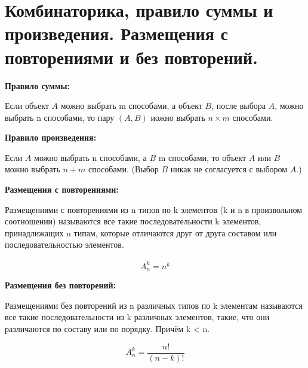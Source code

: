 


    
\tableofcontents

\newpage

\section{Комбинаторика, правило суммы и произведения.
Размещения с повторениями и без повторений.}

\textbf{Правило суммы:}
    \smallskip

    Если объект $A$ можно выбрать m способами, а объект $B$, после выбора $A$, 
    можно выбрать n способами, то пару $(A, B)$ иожно выбрать $n \times m$
    способами.
    \bigskip

\textbf{Правило произведения:}
    \smallskip

    Если $A$ можно выбрать n способами, а $B$ m способами, то объект 
    $A$ или $B$ можно выбрать $n + m$ способами. (Выбор $B$ никак не
    согласуется с выбором $A$.)
    \bigskip

\textbf{Размещения с повторениями:}
    \smallskip
    
    Размещениями с повторениями из n типов по k элементов (k и n в произвольном
    соотношении) называются все такие последовательности k элементов,
    принадлижащих n типам, которые отличаются друг от друга составом
    или последовательностью элементов. 
    
    \[
        \overline{A^{k}_n} = n^k 
    \]
    \bigskip

\textbf{Размещения без повторений:}
    \smallskip
    
    Размещениями без повторений из n различных типов по k элементам называются
    все такие последовательности из k различных элементов, такие, что они
    различаются по составу или по порядку. Причём k < n.

    \[
        A^k_n = \frac{n!}{(n - k)!}  
    \]

